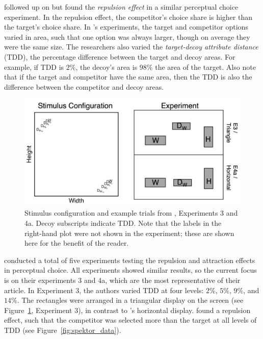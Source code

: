 \textcite{spektorWhenGoodLooks2018b} followed up on \textcite{trueblood2013not} but found the \textit{repulsion effect} in a similar perceptual choice experiment. In the repulsion effect, the competitor's choice share is higher than the target's choice share. In \textcite{spektorWhenGoodLooks2018b}'s experiments, the target and competitor options varied in area, such that one option was always larger, though on average they were the same size. The researchers also varied the \textit{target-decoy attribute distance} (TDD), the percentage difference between the target and decoy areas. For example, if TDD is $2\%$, the decoy's area is $98\%$ the area of the target. Also note that if the target and competitor have the same area, then the TDD is also the difference between the competitor and decoy areas.

\begin{figure}
   \centering
   \includegraphics[width=\linewidth]{figures/spektor_stim.png}
   \caption{Stimulus configuration and example trials from \textcite{spektorWhenGoodLooks2018b}, Experiments 3 and 4a. Decoy subscripts indicate TDD. Note that the labels in the right-hand plot were not shown in the experiment; these are shown here for the benefit of the reader.}
   \label{fig:spektor_stim}
\end{figure}

\textcite{spektorWhenGoodLooks2018b} conducted a total of five experiments testing the repulsion and attraction effects in perceptual choice. All experiments showed similar results, so the current focus is on their experiments 3 and 4a, which are the most representative of their article. In Experiment 3, the authors varied TDD at four levels: $2\%$, $5\%$, $9\%$, and $14\%$. The rectangles were arranged in a triangular display on the screen (see Figure~\ref{fig:spektor_stim}, Experiment 3), in contrast to \textcite{trueblood2013not}'s horizontal display. \textcite{spektorWhenGoodLooks2018b} found a repulsion effect, such that the competitor was selected more than the target at all levels of TDD (see Figure~\ref{fig:spektor_data}). 

